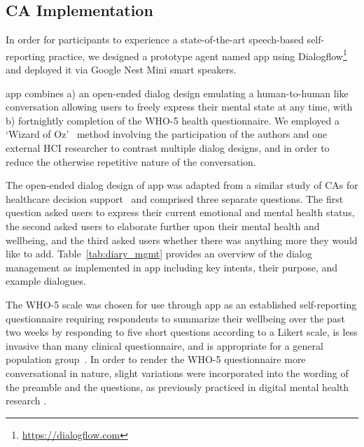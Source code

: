     \subsection{\acl{CA} Implementation}
        
        In order for participants to experience a state-of-the-art speech-based self-reporting practice, we designed a prototype agent named \acl{app} using Dialogflow\footnote{\url{https://dialogflow.com}} and deployed it via Google Nest Mini smart speakers.

        \acl{app} combines a) an open-ended dialog design emulating a human-to-human like conversation allowing users to freely express their mental state at any time, with  b) fortnightly completion of the \ac{WHO-5} health questionnaire. We employed a `Wizard of Oz'~\cite{baum2008wonderful} method involving the participation of the authors and one external \ac{HCI} researcher to contrast multiple dialog designs, and in order to reduce the otherwise repetitive nature of the conversation.
        
        The open-ended dialog design of \acl{app} was adapted from a similar study of \ac{CA}s for healthcare decision support~\cite{devault2014simsensei} and comprised three separate questions. The first question asked users to express their current emotional and mental health status, the second asked users to elaborate further upon their mental health and wellbeing, and the third asked users whether there was anything more they would like to add. Table~\ref{tab:diary_mgmt} provides an overview of the dialog management as implemented in \acl{app} including key intents, their purpose, and example dialogues.
        
        The \ac{WHO-5} scale was chosen for use through \acl{app} as an established self-reporting questionnaire requiring respondents to summarize their wellbeing over the past two weeks by responding to five short questions according to a Likert scale, is less invasive than many clinical questionnaire, and is appropriate for a general population group~\cite{topp20155}. In order to render the \ac{WHO-5} questionnaire more conversational in nature, slight variations were incorporated into the wording of the preamble and the questions, as previously practiced in digital mental health research \cite{torous2015utilizing}. 

